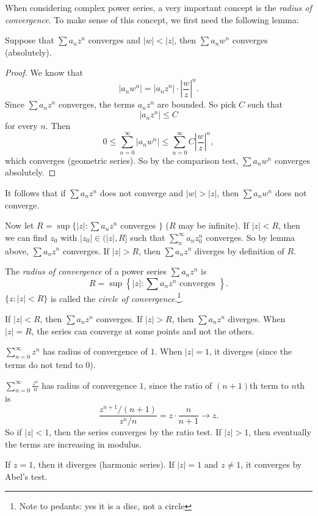 \documentclass[a4paper]{article}
\begin{document}
When considering complex power series, a very important concept is the \emph{radius of convergence}. To make sense of this concept, we first need the following lemma:
\begin{lemma}
  Suppose that $\sum a_nz^n$ converges and $|w| < |z|$, then $\sum a_n w^n$ converges (absolutely).
\end{lemma}

\begin{proof}
  We know that
  \[
    |a_n w^n| = |a_nz^n|\cdot \left|\frac{w}{z}\right|^n.
  \]
  Since $\sum a_nz^n$ converges, the terms $a_nz^n$ are bounded. So pick $C$ such that
  \[
    |a_nz^n| \leq C
  \]
  for every $n$. Then
  \[
    0 \leq \sum_{n = 0}^\infty |a_nw^n| \leq \sum_{n = 0}^\infty C\left|\frac{w}{z}\right|^n,
  \]
  which converges (geometric series). So by the comparison test, $\sum a_nw^n$ converges absolutely.
\end{proof}
It follows that if $\sum a_nz^n$ does not converge and $|w| > |z|$, then $\sum a_nw^n$ does not converge.

Now let $R = \sup\{|z|: \sum a_nz^n$ converges $\}$ ($R$ may be infinite). If $|z| < R$, then we can find $z_0$ with $|z_0|\in (|z|, R]$ such that $\sum_n^\infty a_nz_0^n$ converges. So by lemma above, $\sum a_n z^n$ converges. If $|z| > R$, then $\sum a_nz^n$ diverges by definition of $R$.

\begin{defi}
  The \emph{radius of convergence} of a power series $\sum a_nz^n$ is
  \[
    R = \sup\left\{|z|: \sum a_nz^n\text{ converges }\right\}.
  \]
  $\{z: |z| < R\}$ is called the \emph{circle of convergence}.\footnote{Note to pedants: yes it is a disc, not a circle}.

  If $|z| < R$, then $\sum a_nz^n$ converges. If $|z| > R$, then $\sum a_nz^n$ diverges. When $|z| = R$, the series can converge at some points and not the others.
\end{defi}

\begin{eg}
  $\displaystyle\sum_{n = 0}^\infty z^n$ has radius of convergence of $1$. When $|z| = 1$, it diverges (since the terms do not tend to $0$).
\end{eg}

\begin{eg}
  $\displaystyle\sum_{n = 0}^\infty \frac{z^n}{n}$ has radius of convergence $1$, since the ratio of $(n + 1)$th term to $n$th is
  \[
    \frac{z^{n + 1}/(n + 1)}{z^n /n} = z\cdot\frac{n}{n + 1} \to z.
  \]
  So if $|z| < 1$, then the series converges by the ratio test. If $|z| > 1$, then eventually the terms are increasing in modulus.

  If $z = 1$, then it diverges (harmonic series). If $|z| = 1$ and $z \not= 1$, it converges by Abel's test.
\end{eg}
\end{document}
